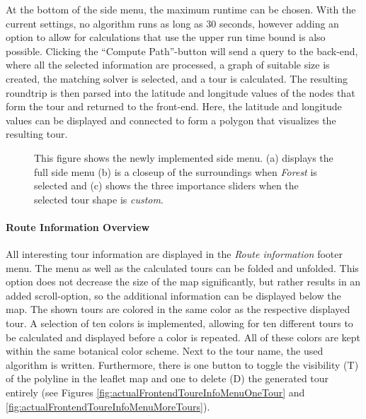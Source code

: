 At the bottom of the side menu, the maximum runtime can be chosen.
With the current settings, no algorithm runs as long as 30 seconds, however adding an option to allow for calculations that use the upper run time bound is also possible.
Clicking the \enquote{Compute Path}-button will send a query to the back-end, where all the selected information are processed, a graph of suitable size is created, the matching solver is selected, and a tour is calculated.
The resulting roundtrip is then parsed into the latitude and longitude values of the nodes that form the tour and returned to the front-end.
Here, the latitude and longitude values can be displayed and connected to form a polygon that visualizes the resulting tour.

\begin{figure}
	\centering
	\usebox{\measurebox}\qquad\hfill
	\begin{minipage}[b][\ht\measurebox][s]{.5\textwidth}
		\centering
		
		\vfill
		
	\end{minipage}
	\caption{This figure shows the newly implemented side menu. (a) displays the full side menu (b) is a closeup of the surroundings when \textit{Forest} is selected and (c) shows the three importance sliders when the selected tour shape is \textit{custom}.}
	\label{fig:actualFrontendSideMenu}
\end{figure}

\paragraph{Route Information Overview}

All interesting tour information are displayed in the \textit{Route information} footer menu. 
The menu as well as the calculated tours can be folded and unfolded.
This option does not decrease the size of the map significantly, but rather results in an added scroll-option, so the additional information can be displayed below the map.
The shown tours are colored in the same color as the respective displayed tour. 
A selection of ten colors is implemented, allowing for ten different tours to be calculated and displayed before a color is repeated. 
All of these colors are kept within the same botanical color scheme.
Next to the tour name, the used algorithm is written.
Furthermore, there is one button to toggle the visibility (T) of the polyline in the leaflet map and one to delete (D) the generated tour entirely (see Figures \ref{fig:actualFrontendToureInfoMenuOneTour} and \ref{fig:actualFrontendToureInfoMenuMoreTours}).

